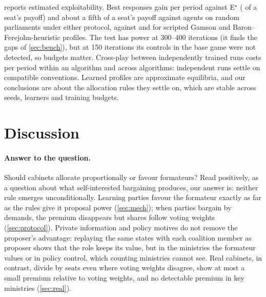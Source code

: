 \documentclass[11pt,a4paper]{article}
\begin{document}
 reports estimated exploitability. Best responses gain \GainLong{} per period against
E$^\star$ (\GainLongRel{} of a seat's payoff) and about a fifth of a seat's payoff against agents on random
parliaments under either protocol, against \GainLongGamson{} and \GainLongMyopic{} for scripted Gamson and
Baron--Ferejohn-heuristic profiles. The test has power at 300--400 iterations (it finds the gaps of
\cref{sec:bench}), but at 150 iterations its controls in the base game were not detected, so budgets
matter. Cross-play between independently trained runs costs \CmSame{} per period within an algorithm and
\CmAcross{} across algorithms: independent runs settle on compatible conventions. Learned profiles are
approximate equilibria, and our conclusions are about the allocation rules they settle on, which are
stable across seeds, learners and training budgets.

\section{Discussion}\label{sec:discussion}
\paragraph{Answer to the question.} Should cabinets allocate proportionally or favour formateurs? Read
positively, as a question about what self-interested bargaining produces, our answer is: neither rule
emerges unconditionally. Learning parties favour the formateur exactly as far as the rules give it
proposal power (\cref{sec:mech}); when parties bargain by demands, the premium disappears but shares
follow voting weights (\cref{sec:protocol}). Private information and policy motives do not remove the proposer's advantage: replaying the same states
with each coalition member as proposer shows that the role keeps its value, but in the ministries the
formateur values or in policy control, which counting ministries cannot see. Real cabinets, in contrast, divide by seats even where voting weights
disagree, show at most a small premium relative to voting weights, and no detectable premium in key
ministries (\cref{sec:real}).
\end{document}
